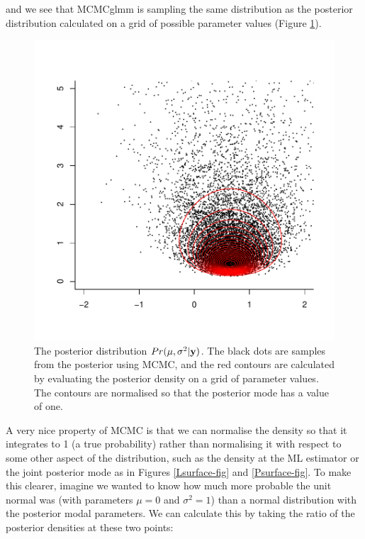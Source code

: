 \documentclass{article}
\begin{document}
and we see that MCMCglmm is sampling the same distribution as the posterior distribution calculated on a grid of possible parameter values (Figure \ref{PsurfaceMCMC-fig}).\\

\iftalk
\else
\fi

\begin{figure}[!h]
\begin{center}
\includegraphics{Lecture1-041}
\end{center}
\caption{The posterior distribution $Pr(\mu, \sigma^{2} | {\bf y})$. The black dots are samples from the posterior using MCMC, and the red contours are calculated by evaluating the posterior density on a grid of parameter values. The contours are normalised so that the posterior mode has a value of one.}
\label{PsurfaceMCMC-fig}
\end{figure}

A very nice property of MCMC is that we can normalise the density so that it integrates to 1 (a true probability) rather than normalising it with respect to some other aspect of the distribution, such as the density at the ML estimator or the joint posterior mode as in Figures \ref{Lsurface-fig} and \ref{Psurface-fig}. To make this clearer, imagine we wanted to know how much more probable the unit normal was (with parameters $\mu=0$ and $\sigma^{2}=1$) than a normal distribution with the posterior modal parameters. We can calculate this by taking the ratio of the posterior densities at these two points:  \\ 
 
\end{document}
